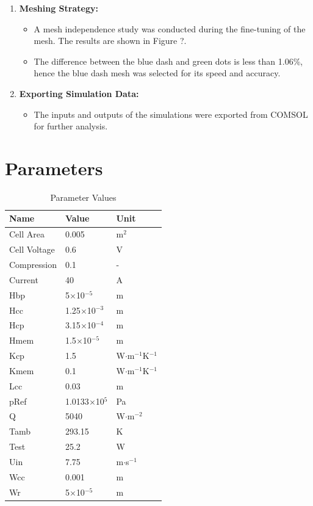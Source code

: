 \documentclass{report}
\begin{document}
\begin{enumerate}
            \item \textbf{Meshing Strategy:}
            \begin{itemize}
                \item A mesh independence study was conducted during the fine-tuning of the mesh. The results are shown in Figure ?.
                \item The difference between the blue dash and green dots is less than 1.06\%, hence the blue dash mesh was selected for its speed and accuracy.
            \end{itemize}
            
            \item \textbf{Exporting Simulation Data:}
            \begin{itemize}
                \item The inputs and outputs of the simulations were exported from COMSOL for further analysis.
            \end{itemize}
        \end{enumerate}

    \newpage \section{Parameters}
    
        \begin{table}[h]
        \centering
        \begin{tabularx}{\textwidth}{X X X}
        \toprule
        \textbf{Name} & \textbf{Value} & \textbf{Unit} \\ 
        \midrule
        Cell Area & 0.005 & m$^2$ \\ 
        Cell Voltage & 0.6 & V \\ 
        Compression & 0.1 & - \\ 
        Current & 40 & A \\ 
        Hbp & 5$\times$10$^{-5}$ & m \\ 
        Hcc & 1.25$\times$10$^{-3}$ & m \\ 
        Hcp & 3.15$\times$10$^{-4}$ & m \\ 
        Hmem & 1.5$\times$10$^{-5}$ & m \\ 
        Kcp & 1.5 & W$\cdot$m$^{-1}$K$^{-1}$ \\ 
        Kmem & 0.1 & W$\cdot$m$^{-1}$K$^{-1}$ \\ 
        Lcc & 0.03 & m \\ 
        pRef & 1.0133$\times$10$^5$ & Pa \\ 
        Q & 5040 & W$\cdot$m$^{-2}$ \\ 
        Tamb & 293.15 & K \\ 
        Test & 25.2 & W \\ 
        Uin & 7.75 & m$\cdot$s$^{-1}$ \\ 
        Wcc & 0.001 & m \\ 
        Wr & 5$\times$10$^{-5}$ & m \\ 
        \bottomrule
        \end{tabularx}
        \caption{Parameter Values}
        \label{tab:parameters}
        \end{table}
    
\end{document}
